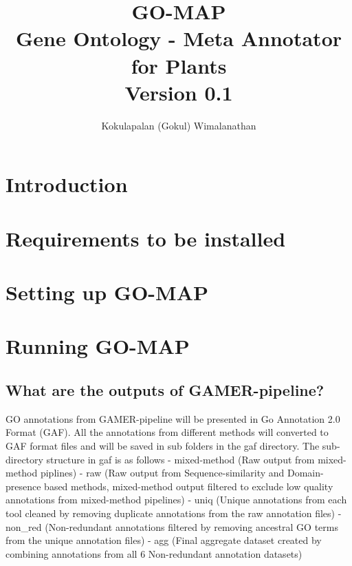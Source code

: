 \documentclass[11pt,letterpaper]{article}
\title{
  \textbf{GO-MAP} \\
  \Large{ Gene Ontology - Meta Annotator for Plants} \\
  \large {Version 0.1}
}
\author{Kokulapalan (Gokul) Wimalanathan}
\begin{document}

\maketitle
\newpage

\section{Introduction}



\section{Requirements to be installed}



\section{Setting up GO-MAP}


\section{Running GO-MAP}




\subsection{What are the outputs of
 GAMER-pipeline?}\label{what-are-the-outputs-of-gamer-pipeline}

GO annotations from GAMER-pipeline will be presented in Go Annotation
2.0 Format (GAF). All the annotations from different methods will
converted to GAF format files and will be saved in sub folders in the
gaf directory. The sub-directory structure in gaf is as follows -
mixed-method (Raw output from mixed-method piplines) - raw (Raw output
from Sequence-similarity and Domain-presence based methods, mixed-method
output filtered to exclude low quality annotations from mixed-method
pipelines) - uniq (Unique annotations from each tool cleaned by removing
duplicate annotations from the raw annotation files) - non\_red
(Non-redundant annotations filtered by removing ancestral GO terms from
the unique annotation files) - agg (Final aggregate dataset created by
combining annotations from all 6 Non-redundant annotation datasets)
\end{document}
